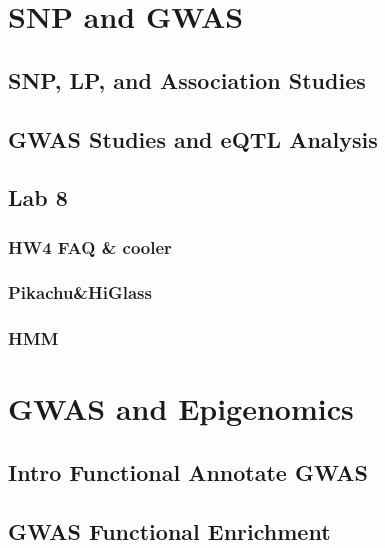 \documentclass[
]{book}
\begin{document}
\hypertarget{gwas1}{%
\chapter{SNP and GWAS}\label{gwas1}}

\hypertarget{snp-lp-and-association-studies}{%
\section{SNP, LP, and Association Studies}\label{snp-lp-and-association-studies}}

\hypertarget{gwas-studies-and-eqtl-analysis}{%
\section{GWAS Studies and eQTL Analysis}\label{gwas-studies-and-eqtl-analysis}}

\hypertarget{lab-8}{%
\section{Lab 8}\label{lab-8}}

\hypertarget{hw4-faq-cooler}{%
\subsection{HW4 FAQ \& cooler}\label{hw4-faq-cooler}}

\hypertarget{pikachuhiglass}{%
\subsection{Pikachu\&HiGlass}\label{pikachuhiglass}}

\hypertarget{hmm-1}{%
\subsection{HMM}\label{hmm-1}}

\hypertarget{gwas2}{%
\chapter{GWAS and Epigenomics}\label{gwas2}}

\hypertarget{intro-functional-annotate-gwas}{%
\section{Intro Functional Annotate GWAS}\label{intro-functional-annotate-gwas}}

\hypertarget{gwas-functional-enrichment}{%
\section{GWAS Functional Enrichment}\label{gwas-functional-enrichment}}
\end{document}
